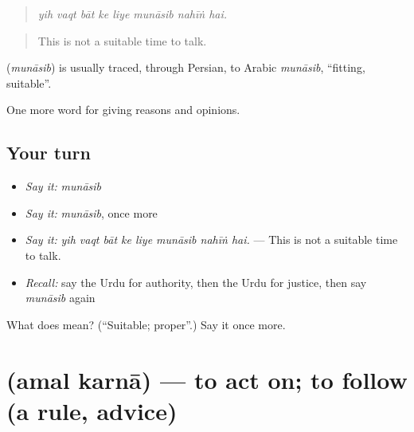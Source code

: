 \begin{quote}
       
\end{quote}

\begin{quote}
\emph{yih vaqt bāt ke liye munāsib nahīṅ hai.}
\end{quote}

\begin{quote}
This is not a suitable time to talk.
\end{quote}

\begin{cousinweb}
\textbf{} (\emph{munāsib}) is usually traced, through Persian, to Arabic \emph{munāsib}, \textquotedblleft{}fitting, suitable\textquotedblright{}.
\end{cousinweb}

\begin{grammarlens}[title={What you've built}]
One more word for giving reasons and opinions.
\end{grammarlens}

\subsection*{Your turn}
\begin{itemize}
\raggedright
  \item \emph{Say it:} \emph{munāsib}
  \item \emph{Say it:} \emph{munāsib}, once more
  \item \emph{Say it:} \emph{yih vaqt bāt ke liye munāsib nahīṅ hai.} — This is not a suitable time to talk.
  \item \emph{Recall:} say the Urdu for authority, then the Urdu for justice, then say \emph{munāsib} again
\end{itemize}

\begin{tcolorbox}[breakable,colback=teal!4,colframe=teal!35!black,title={Before you move on}]
What does  mean? (\textquotedblleft{}Suitable; proper\textquotedblright{}.) Say it once more.
\end{tcolorbox}
\section[\texorpdfstring{\ur{عمل} \ur{کرنا} (amal karnā)}{عمل کرنا (amal karnā)}]{  (amal karnā) — to act on; to follow (a rule, advice)}

